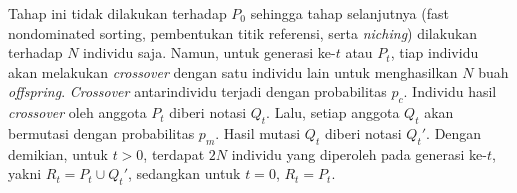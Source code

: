 Tahap ini tidak dilakukan terhadap $P_0$ sehingga tahap selanjutnya (fast nondominated sorting, pembentukan titik referensi, serta \textit{niching}) dilakukan terhadap $N$ individu saja. Namun, untuk generasi ke-$t$ atau $P_t$, tiap individu akan melakukan \textit{crossover} dengan satu individu lain untuk menghasilkan $N$ buah \textit{offspring}. \textit{Crossover} antarindividu terjadi dengan probabilitas $p_c$. Individu hasil \textit{crossover} oleh anggota $P_t$ diberi notasi $Q_t$. Lalu, setiap anggota $Q_t$ akan bermutasi dengan probabilitas $p_m$. Hasil mutasi $Q_t$ diberi notasi $Q_t'$. Dengan demikian, untuk $t > 0$, terdapat $2N$ individu yang diperoleh pada generasi ke-$t$, yakni $R_t = P_t \cup Q_t'$, sedangkan untuk $t = 0$, $R_t = P_t$.
